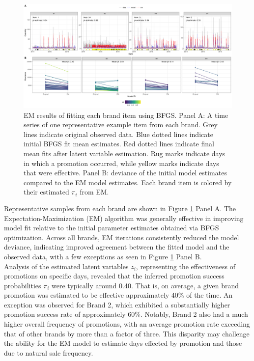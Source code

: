 \documentclass{article}
\begin{document}
\begin{figure}[!ht]
    \centering
    \includegraphics[width=0.9\linewidth]{figures/em_results.png}
    \caption{EM results of fitting each brand item using BFGS. Panel A: A time series of one representative example item from each brand. Grey lines indicate original observed data. Blue dotted lines indicate initial BFGS fit mean estimates. Red dotted lines indicate final mean fits after latent variable estimation. Rug marks indicate days in which a promotion occurred, while yellow marks indicate days that were effective. Panel B: deviance of the initial model estimates compared to the EM model estimates. Each brand item is colored by their estimated $\pi_i$ from EM.}
    \label{fig:EM-Est}
\end{figure}

\noindent Representative samples from each brand are shown in Figure \ref{fig:EM-Est} Panel A. The Expectation-Maximization (EM) algorithm was generally effective in improving model fit relative to the initial parameter estimates obtained via BFGS optimization. Across all brands, EM iterations consistently reduced the model deviance, indicating improved agreement between the fitted model and the observed data, with a few exceptions as seen in Figure \ref{fig:EM-Est} Panel B. \\

\noindent Analysis of the estimated latent variables $z_i$, representing the effectiveness of promotions on specific days, revealed that the inferred promotion success probabilities $\pi_i$ were typically around 0.40. That is, on average, a given brand promotion was estimated to be effective approximately 40\% of the time. An exception was observed for Brand 2, which exhibited a substantially higher promotion success rate of approximately 60\%. Notably, Brand 2 also had a much higher overall frequency of promotions, with an average promotion rate exceeding that of other brands by more than a factor of three. This disparity may challenge the ability for the EM model to estimate days effected by promotion and those due to natural sale frequency.
\end{document}
